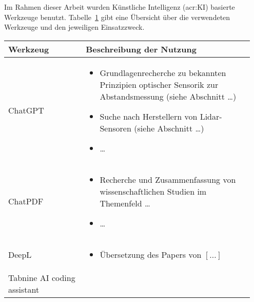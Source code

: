 \setcounter{chapter}{1}

Im Rahmen dieser Arbeit wurden Künstliche Intelligenz (\acrshort{acr:KI}) basierte Werkzeuge benutzt. Tabelle~\ref{tab:anhang_uebersicht_KI_werkzeuge} gibt eine Übersicht über die verwendeten Werkzeuge und den jeweiligen Einsatzzweck.

\begin{table}[hbt]	
	\centering
	\renewcommand{\arraystretch}{1.5}	%
	\label{tab:anhang_uebersicht_KI_werkzeuge}
	\begin{tabular}{>{\raggedright\arraybackslash}p{0.3\linewidth} >{\raggedright\arraybackslash}p{0.65\linewidth}}
		\textbf{Werkzeug} & \textbf{Beschreibung der Nutzung}\\
		\hline 
		\hline
		ChatGPT & 	\vspace{-\topsep}
					\begin{itemize}[noitemsep,topsep=0pt,partopsep=0pt,parsep=0pt] 
						\item Grundlagenrecherche zu bekannten Prinzipien optischer Sensorik zur Abstandsmessung (siehe Abschnitt \ldots)
						\item Suche nach Herstellern von Lidar-Sensoren (siehe Abschnitt \ldots)
						\item \ldots
				   	\end{itemize} \\
		ChatPDF &	\vspace{-\topsep}
					\begin{itemize}[noitemsep,topsep=0pt,partopsep=0pt,parsep=0pt] 
					\item Recherche und Zusammenfassung von wissenschaftlichen Studien im Themenfeld \ldots
					\item \ldots
					\end{itemize} \\ 
		DeepL	&	\vspace{-\topsep}
					\begin{itemize}[noitemsep,topsep=0pt,partopsep=0pt,parsep=0pt] 
					\item Übersetzung des Papers von $[\ldots]$
					\end{itemize} \\ 
		Tabnine AI coding assistant &	\vspace{-\topsep}
							\begin{itemize}[noitemsep,topsep=0pt,partopsep=0pt,parsep=0pt] 

\end{itemize}
\end{tabular}
\end{table}
